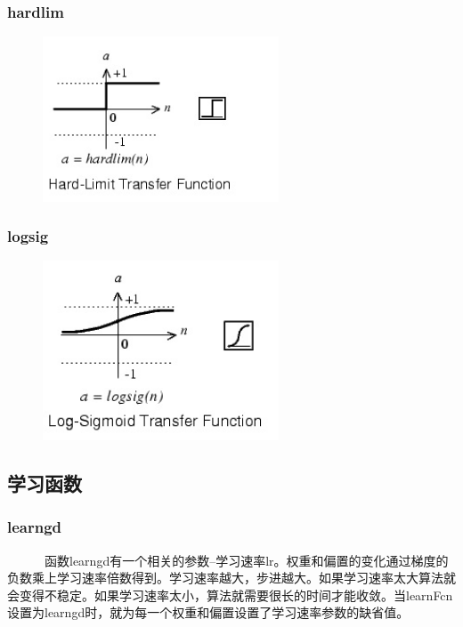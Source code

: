 \documentclass[slidestop,compress,mathserif,c]{beamer}
\begin{document}
\begin{frame}
\frametitle{hardlim}
\begin{figure}
\centering
\includegraphics[width=7cm]{hardlim}
\end{figure}


\end{frame}



\begin{frame}
\frametitle{logsig}
\begin{figure}
\centering
\includegraphics[width=7cm]{logsig}
\end{figure}

\end{frame}

\subsection{学习函数}
\begin{frame}
\frametitle{learngd}
~~~~~~函数learngd有一个相关的参数--学习速率lr。权重和偏置的变化通过梯度的负数乘上学习速率倍数得到。学习速率越大，步进越大。如果学习速率太大算法就会变得不稳定。如果学习速率太小，算法就需要很长的时间才能收敛。当learnFcn设置为learngd时，就为每一个权重和偏置设置了学习速率参数的缺省值。

\end{frame}
\end{document}
